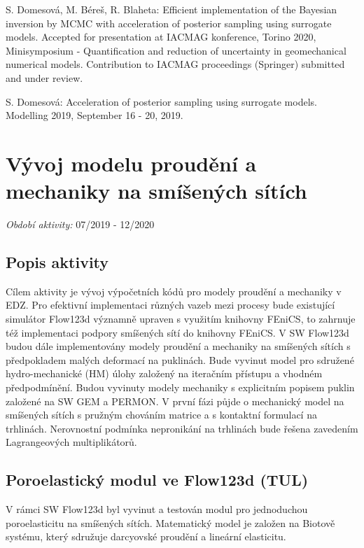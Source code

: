 \documentclass[11pt,a4paper]{article}
\begin{document}
\begin{onehalfspacing}
\vspace{2ex}

S. Domesová, M. Béreš, R. Blaheta: Efficient implementation of the Bayesian inversion by MCMC with acceleration of posterior sampling using surrogate models. Accepted for presentation at IACMAG konference, Torino 2020, Minisymposium - Quantification and reduction of uncertainty in geomechanical numerical models. Contribution to IACMAG proceedings (Springer) submitted and under review.

S. Domesová: Acceleration of posterior sampling using surrogate models. Modelling 2019, September 16 - 20, 2019.


\section{Vývoj modelu proudění a mechaniky na smíšených sítích}
{\it Období aktivity:}  07/2019 - 12/2020

\subsection{Popis aktivity}
Cílem aktivity je vývoj výpočetních kódů pro modely proudění a mechaniky v EDZ. Pro efektivní implementaci různých vazeb mezi
procesy bude existující simulátor Flow123d významně upraven s využitím knihovny FEniCS, to zahrnuje též implementaci podpory
smíšených sítí do knihovny FEniCS. V SW Flow123d budou dále implementovány modely proudění a mechaniky na smíšených sítích s
předpokladem malých deformací na puklinách.
Bude vyvinut model pro sdružené hydro-mechanické (HM) úlohy založený na iteračním přístupu a vhodném předpodmínění.
Budou vyvinuty modely mechaniky s explicitním popisem puklin založené na SW GEM a PERMON. V první fázi půjde o mechanický
model na smíšených sítích s pružným chováním matrice a s kontaktní formulací na trhlinách. Nerovnostní podmínka nepronikání na
trhlinách bude řešena zavedením Lagrangeových multiplikátorů.

\subsection{Poroelastický modul ve Flow123d (TUL)}
V rámci SW Flow123d byl vyvinut a testován modul pro jednoduchou poroelasticitu na smíšených sítích. Matematický model je založen na Biotově systému, který sdružuje darcyovské proudění a lineární elasticitu.


\end{onehalfspacing}
\end{document}
